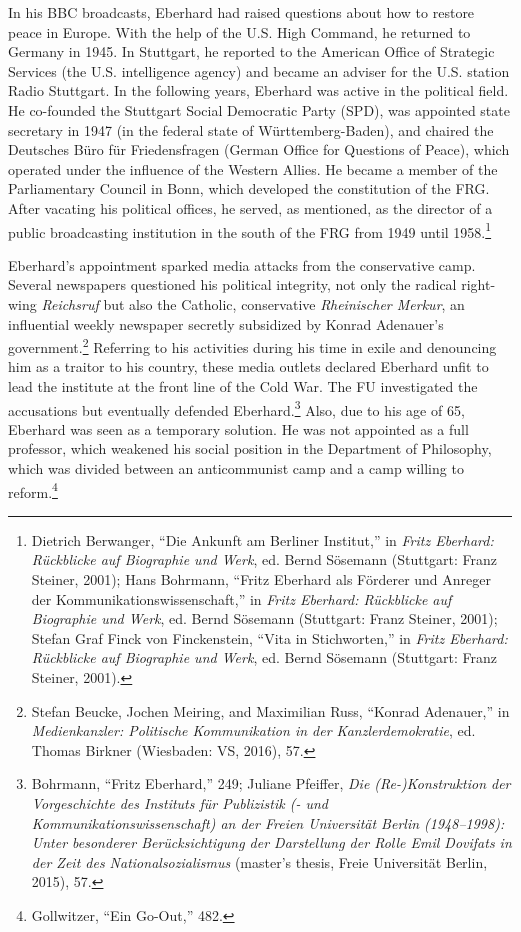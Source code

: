 \documentclass{tufte-handout}
\begin{document}
In his BBC broadcasts, Eberhard had raised questions about how to
restore peace in Europe. With the help of the U.S. High Command, he
returned to Germany in 1945. In Stuttgart, he reported to the American
Office of Strategic Services (the U.S. intelligence agency) and became
an adviser for the U.S. station Radio Stuttgart. In the following years,
Eberhard was active in the political field. He co-founded the Stuttgart
Social Democratic Party (SPD), was appointed state secretary in 1947 (in
the federal state of Württemberg-Baden), and chaired the Deutsches Büro
für Friedensfragen (German Office for Questions of Peace), which
operated under the influence of the Western Allies. He became a member
of the Parliamentary Council in Bonn, which developed the constitution
of the FRG. After vacating his political offices, he served, as
mentioned, as the director of a public broadcasting institution in the
south of the FRG from 1949 until 1958.\footnote{Dietrich Berwanger,
  ``Die Ankunft am Berliner Institut,'' in \emph{Fritz Eberhard:
  Rückblicke auf Biographie und Werk}, ed. Bernd Sösemann (Stuttgart:
  Franz Steiner, 2001); Hans Bohrmann, ``Fritz Eberhard als Förderer und
  Anreger der Kommunikationswissenschaft,'' in \emph{Fritz Eberhard:
  Rückblicke auf Biographie und Werk}, ed. Bernd Sösemann (Stuttgart:
  Franz Steiner, 2001); Stefan Graf Finck von Finckenstein, ``Vita in
  Stichworten,'' in \emph{Fritz Eberhard: Rückblicke auf Biographie und
  Werk}, ed. Bernd Sösemann (Stuttgart: Franz Steiner, 2001).}

Eberhard's appointment sparked media attacks from the conservative camp.
Several newspapers questioned his political integrity, not only the
radical right-wing \emph{Reichsruf} but also the Catholic, conservative
\emph{Rheinischer Merkur}, an influential weekly newspaper secretly
subsidized by Konrad Adenauer's government.\footnote{Stefan Beucke,
  Jochen Meiring, and Maximilian Russ, ``Konrad Adenauer,'' in
  \emph{Medienkanzler: Politische Kommunikation in der
  Kanzlerdemokratie}, ed. Thomas Birkner (Wiesbaden: VS, 2016), 57.}
Referring to his activities during his time in exile and denouncing him
as a traitor to his country, these media outlets declared Eberhard unfit
to lead the institute at the front line of the Cold War. The FU
investigated the accusations but eventually defended
Eberhard.\footnote{Bohrmann, ``Fritz Eberhard,'' 249; Juliane Pfeiffer,
  \emph{Die (Re-)Konstruktion der Vorgeschichte des Instituts für
  Publizistik (- und Kommunikationswissenschaft) an der Freien
  Universität Berlin (1948--1998): Unter besonderer Berücksichtigung der
  Darstellung der Rolle Emil Dovifats in der Zeit des
  Nationalsozialismus} (master's thesis, Freie Universität Berlin,
  2015), 57.} Also, due to his age of 65, Eberhard was seen as a
temporary solution. He was not appointed as a full professor, which
weakened his social position in the Department of Philosophy, which was
divided between an anticommunist camp and a camp willing to
reform.\footnote{Gollwitzer, ``Ein Go-Out,'' 482.}
\end{document}
